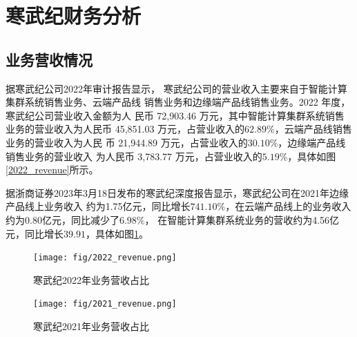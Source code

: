 

\section{寒武纪财务分析}
\subsection{业务营收情况}
据寒武纪公司2022年审计报告显示，
寒武纪公司的营业收入主要来自于智能计算集群系统销售业务、云端产品线
销售业务和边缘端产品线销售业务。2022 年度，寒武纪公司营业收入金额为人
民币 72,903.46 万元，其中智能计算集群系统销售业务的营业收入为人民币
45,851.03 万元，占营业收入的$62.89\%$，云端产品线销售业务的营业收入为人民
币 21,944.89 万元，占营业收入的$30.10\%$，边缘端产品线销售业务的营业收入
为人民币 3,783.77 万元，占营业收入的$5.19\%$，具体如图\ref{2022_revenue}所示。\par
据浙商证券2023年3月18日发布的寒武纪深度报告显示，寒武纪公司在2021年边缘产品线上业务收入
约为1.75亿元，同比增长$741.10\%$，在云端产品线上的业务收入约为0.80亿元，同比减少了$6.98\%$，
在智能计算集群系统业务的营收约为4.56亿元，同比增长$39.91$，具体如图\ref{2021_revenue}。
\begin{figure}[htb]
    \centering
  \begin{minipage}{0.49\linewidth}
    \centering
    \texttt{[image: fig/2022\_revenue.png]}
    \caption{寒武纪2022年业务营收占比}\label{2022_revenue}
  \end{minipage}
  \begin{minipage}{0.49\linewidth}
    \centering
    \texttt{[image: fig/2021\_revenue.png]}
    \caption{寒武纪2021年业务营收占比}\label{2021_revenue}
  \end{minipage}
  \end{figure}
  
